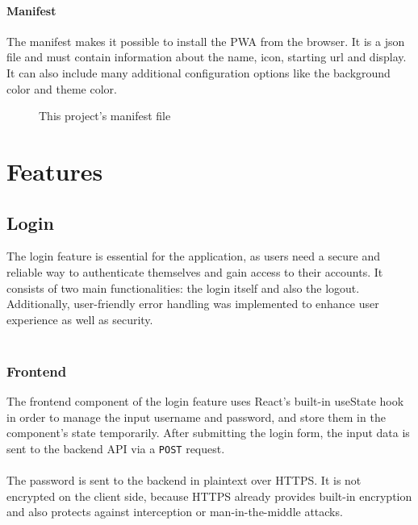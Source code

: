 \documentclass[a4paper,12pt]{report}
\begin{document}
\subsubsection{Manifest}
The manifest makes it possible to install the PWA from the browser. It is a json file and must contain information about the name, icon, starting url and display. It can also include many additional configuration options like the background color and theme color. \parencite{mdn-pwa-installation}
\begin{figure}[H]
	\caption{This project's manifest file}
	\label{fig:example-maifest}
\end{figure} 

\chapter{Features}
\section{Login}
The login feature is essential for the application, as users need a secure and reliable way to authenticate themselves and gain access to their accounts. It consists of two main functionalities: the login itself and also the logout. Additionally, user-friendly error handling was implemented to enhance user experience as well as security. \\\\
\subsection{Frontend}
The frontend component of the login feature uses React's built-in useState hook in order to manage the input username and password, and store them in the component's state temporarily. After submitting the login form, the input data is sent to the backend API via a \texttt{POST} request. \\\\
The password is sent to the backend in plaintext over HTTPS. It is not encrypted on the client side, because HTTPS already provides built-in encryption and also protects against interception or man-in-the-middle attacks. \\\\
\end{document}
